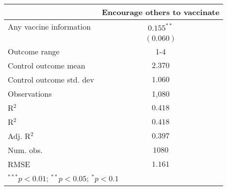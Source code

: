 
\begin{table}
\begin{center}
\begin{tabular}{l c}
\hline
 & Encourage others to vaccinate \\
\hline
Any vaccine information  & $0.155^{**}$ \\
                         & $(0.060)$    \\
\hline
Outcome range            & 1-4          \\
Control outcome mean     & $2.370$      \\
Control outcome std. dev & $1.060$      \\
Observations             & 1,080        \\
R$^{2}$                  & $0.418$      \\
R$^2$                    & $0.418$      \\
Adj. R$^2$               & $0.397$      \\
Num. obs.                & $1080$       \\
RMSE                     & $1.161$      \\
\hline
\multicolumn{2}{l}{\scriptsize{$^{***}p<0.01$; $^{**}p<0.05$; $^{*}p<0.1$}}
\end{tabular}
\caption{}
\label{table:Tables and Figures/SI_table21_anyinfo_Chile_encourage1-4}
\end{center}
\end{table}
